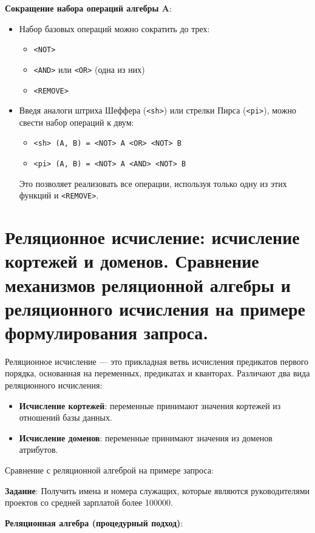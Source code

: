 \documentclass[a4paper,12pt]{article}
\begin{document}
\textbf{Сокращение набора операций алгебры A}:

\begin{itemize}
    \item Набор базовых операций можно сократить до трех:
    \begin{itemize}
        \item \texttt{<NOT>}
        \item \texttt{<AND>} или \texttt{<OR>} (одна из них)
        \item \texttt{<REMOVE>}
    \end{itemize}
    \item Введя аналоги штриха Шеффера (\texttt{<sh>}) или стрелки Пирса (\texttt{<pi>}), можно свести набор операций к двум:
    \begin{itemize}
        \item \texttt{<sh> (A, B) = <NOT> A <OR> <NOT> B}
        \item \texttt{<pi> (A, B) = <NOT> A <AND> <NOT> B}
    \end{itemize}
    Это позволяет реализовать все операции, используя только одну из этих функций и \texttt{<REMOVE>}.
\end{itemize}

\section{Реляционное исчисление: исчисление кортежей и доменов. Сравнение механизмов реляционной алгебры и реляционного исчисления на примере формулирования запроса.}
Реляционное исчисление — это прикладная ветвь исчисления предикатов первого порядка, основанная на переменных, предикатах и кванторах. Различают два вида реляционного исчисления:
    
\begin{itemize}
    \item \textbf{Исчисление кортежей}: переменные принимают значения кортежей из отношений базы данных.
    \item \textbf{Исчисление доменов}: переменные принимают значения из доменов атрибутов.
\end{itemize}

Сравнение с реляционной алгеброй на примере запроса:

\textbf{Задание}: Получить имена и номера служащих, которые являются руководителями проектов со средней зарплатой более 100000.

\textbf{Реляционная алгебра (процедурный подход)}:
\end{document}
